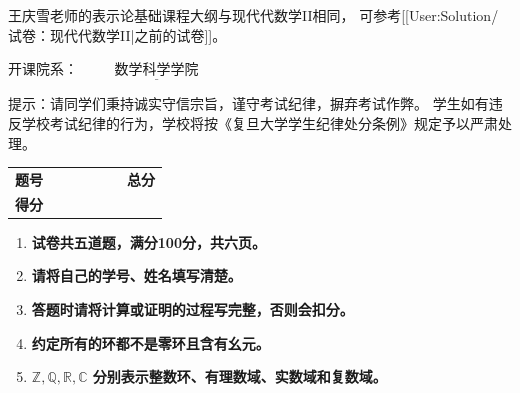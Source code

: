 

王庆雪老师的表示论基础课程大纲与现代代数学II相同，
可参考[[User:Solution/\qquad 试卷：现代代数学II|之前的试卷]]。

\begin{center}

    开课院系：\ \ $\underline{\quad\ \ \,数学科学学院\quad\ \ \,}$\quad    {}
\end{center}
\qquad 提示：请同学们秉持诚实守信宗旨，谨守考试纪律，摒弃考试作弊。
学生如有违反学校考试纪律的行为，学校将按《复旦大学学生纪律处分条例》规定予以严肃处理$\!。$
\begin{table}
\begin{tabular}{|c|c|c|c}
\textbf{题号} &\quad&\quad&\quad&\quad&\quad&\textbf{总分}\\
\textbf{得分} & & & & & & 
\end{tabular}
\end{table}
\begin{enumerate}
    \item \textbf{试卷共五道题，满分100分，共六页。}
    \item \textbf{请将自己的学号、姓名填写清楚。}
    \item \textbf{答题时请将计算或证明的过程写完整，否则会扣分。}
    \item \textbf{约定所有的环都不是零环且含有幺元。}
    \item \textbf{$\mathbb{Z}, \mathbb{Q}, \mathbb{R}, \mathbb{C}$ 分别表示整数环、有理数域、实数域和复数域。}
\end{enumerate}


